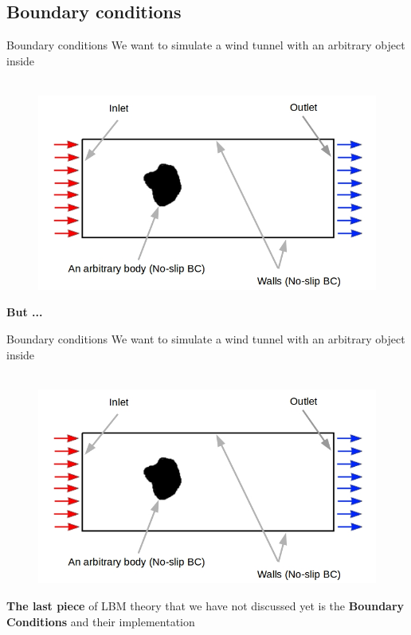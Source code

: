 \documentclass[9pt]{beamer}
\begin{document}
\subsection{Boundary conditions}
\begin{frame}[t]{Boundary conditions}
We want to simulate a wind tunnel with an arbitrary object inside
\\~\\
\begin{figure}
\includegraphics[scale=0.35]{images/wind-tunnel.jpg}
\centering
\end{figure}
\textbf{But ...}
\end{frame}

\begin{frame}[t]{Boundary conditions}
We want to simulate a wind tunnel with an arbitrary object inside
\\~\\
\begin{figure}
\includegraphics[scale=0.35]{images/wind-tunnel.jpg}
\centering
\end{figure}
\textbf{The last piece} of LBM theory that we have not discussed yet is the \textbf{Boundary Conditions} and their implementation
\end{frame}
\end{document}
